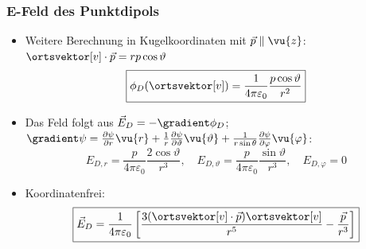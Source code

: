   \begin{frame}
    \frametitle{E-Feld des Punktdipols}
    \begin{itemize}[<+->]
    \item Weitere Berechnung in Kugelkoordinaten mit $\vec{p}\parallel\vu{z}$: $\ortsvektor[v]\cdot\vec{p} = r p \cos\vartheta$
      $$
    \boxed{\phi_D(\ortsvektor[v]) = \frac{1}{4\pi\varepsilon_0} \frac{p\cos\vartheta}{r^2} }
    $$
  \item Das Feld folgt aus $\vec{E}_D = -\gradient \phi_D $; $\gradient\psi = \frac{\partial\psi}{\partial r}\vu{r} + \frac{1}{r} \frac{\partial\psi}{\partial \vartheta}\vu{\vartheta} + \frac{1}{r\sin\theta} \frac{\partial\psi}{\partial \varphi}\vu{\varphi}$:
    $$
    \boxed{E_{D,r} = \frac{p}{4\pi\varepsilon_0} \frac{2\cos\vartheta}{r^3}, \quad E_{D,\vartheta} = \frac{p}{4\pi\varepsilon_0} \frac{\sin\vartheta}{r^3}, \quad E_{D,\varphi} = 0 }
    $$
  \item Koordinatenfrei:
    $$
    \boxed{\vec{E}_{D} = \frac{1}{4\pi\varepsilon_0}\left[ \frac{3(\ortsvektor[v]\cdot\vec{p}) \ortsvektor[v]}{r^5} -\frac{\vec{p}}{r^3} \right]}    
    $$
      \end{itemize}
    \end{frame}


